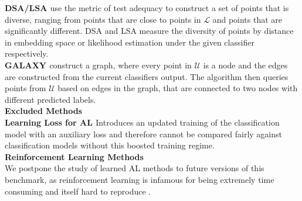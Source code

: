 \documentclass[]{article}
\newcommand{\U}{\mathcal{U}}
\newcommand{\LL}{\mathcal{L}}
\begin{document}
\textbf{DSA/LSA \cite{kim2019guiding}} use the metric of test adequacy to construct a set of points that is diverse, ranging from points that are close to points in $\LL$ and points that are significantly different. DSA and LSA measure the diversity of points by distance in embedding space or likelihood estimation under the given classifier respectively. \\
\textbf{GALAXY \cite{zhang2022galaxy}} construct a graph, where every point in $\U$ is a node and the edges are constructed from the current classifiers output. The algorithm then queries points from $\U$ based on edges in the graph, that are connected to two nodes with different predicted labels. \\ [2mm]
%
\textbf{Excluded Methods}\\
\textbf{Learning Loss for AL \cite{yoo2019learning}}
Introduces an updated training of the classification model with an auxiliary loss and therefore cannot be compared fairly against classification models without this boosted training regime.\\ [1mm]
%
\textbf{Reinforcement Learning Methods} \\
We postpone the study of learned AL methods to future versions of this benchmark, as reinforcement learning is infamous for being extremely time consuming and itself hard to reproduce .


\end{document}
